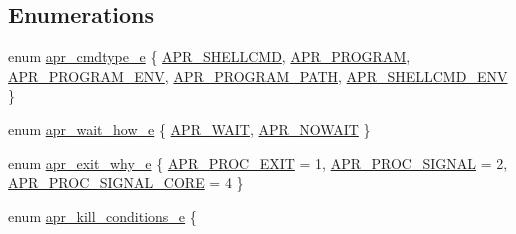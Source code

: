 \subsection*{Enumerations}
\begin{DoxyCompactItemize}
\item 
enum \mbox{\hyperlink{group__apr__thread__proc_gadcb981d7748c580eb69ac11dbf709060}{apr\+\_\+cmdtype\+\_\+e}} \{ \newline
\mbox{\hyperlink{group__apr__thread__proc_ggadcb981d7748c580eb69ac11dbf709060a02f5d83f79e2c12bfca5a86d7f14caa6}{A\+P\+R\+\_\+\+S\+H\+E\+L\+L\+C\+MD}}, 
\mbox{\hyperlink{group__apr__thread__proc_ggadcb981d7748c580eb69ac11dbf709060ac128c1239a524cf21300b8ed6248ac99}{A\+P\+R\+\_\+\+P\+R\+O\+G\+R\+AM}}, 
\mbox{\hyperlink{group__apr__thread__proc_ggadcb981d7748c580eb69ac11dbf709060a6a3f9694aced0e449f6bb4b3e437233a}{A\+P\+R\+\_\+\+P\+R\+O\+G\+R\+A\+M\+\_\+\+E\+NV}}, 
\mbox{\hyperlink{group__apr__thread__proc_ggadcb981d7748c580eb69ac11dbf709060aa424b51bdc16e4d18bb757a32c6a346a}{A\+P\+R\+\_\+\+P\+R\+O\+G\+R\+A\+M\+\_\+\+P\+A\+TH}}, 
\newline
\mbox{\hyperlink{group__apr__thread__proc_ggadcb981d7748c580eb69ac11dbf709060afcefc45317b67fad6dc5459772ce9409}{A\+P\+R\+\_\+\+S\+H\+E\+L\+L\+C\+M\+D\+\_\+\+E\+NV}}
 \}
\item 
enum \mbox{\hyperlink{group__apr__thread__proc_ga5e52d786644f3b66d6180571e68c7260}{apr\+\_\+wait\+\_\+how\+\_\+e}} \{ \mbox{\hyperlink{group__apr__thread__proc_gga5e52d786644f3b66d6180571e68c7260a057885ccf4b8b707e0d115c691037de4}{A\+P\+R\+\_\+\+W\+A\+IT}}, 
\mbox{\hyperlink{group__apr__thread__proc_gga5e52d786644f3b66d6180571e68c7260a0163031f6b72b0c4add9108052a672d5}{A\+P\+R\+\_\+\+N\+O\+W\+A\+IT}}
 \}
\item 
enum \mbox{\hyperlink{group__apr__thread__proc_gac097b4fa41e67024711c5983446d0951}{apr\+\_\+exit\+\_\+why\+\_\+e}} \{ \mbox{\hyperlink{group__apr__thread__proc_ggac097b4fa41e67024711c5983446d0951a977f140c82333af62aa4bed8c99a3ee2}{A\+P\+R\+\_\+\+P\+R\+O\+C\+\_\+\+E\+X\+IT}} = 1, 
\mbox{\hyperlink{group__apr__thread__proc_ggac097b4fa41e67024711c5983446d0951a7e3421d18abe458ca27822d19424225b}{A\+P\+R\+\_\+\+P\+R\+O\+C\+\_\+\+S\+I\+G\+N\+AL}} = 2, 
\mbox{\hyperlink{group__apr__thread__proc_ggac097b4fa41e67024711c5983446d0951a6b667be4983cb59e9bed37ee05a0dcce}{A\+P\+R\+\_\+\+P\+R\+O\+C\+\_\+\+S\+I\+G\+N\+A\+L\+\_\+\+C\+O\+RE}} = 4
 \}
\item 
enum \mbox{\hyperlink{group__apr__thread__proc_ga3eaec78633742e7e0cb9480a21477aff}{apr\+\_\+kill\+\_\+conditions\+\_\+e}} \{ \newline

\end{DoxyCompactItemize}
